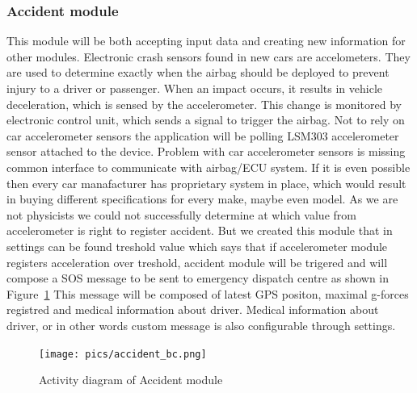 \subsubsection{Accident module} %
\label{ssub:accident_module}
This module will be both accepting input data and creating new information for other modules. Electronic crash sensors found in new cars are accelometers. They are used to determine exactly when the airbag should be deployed to prevent injury to a driver or passenger. When an impact occurs, it results in vehicle deceleration, which is sensed by the accelerometer. This change is monitored by electronic control unit, which sends a signal to trigger the airbag. Not to rely on car accelerometer sensors the application will be polling LSM303 accelerometer sensor attached to the device. Problem with car accelerometer sensors is missing common interface to communicate with airbag/ECU system. If it is even possible then every car manafacturer has proprietary system in place, which would result in buying different specifications for every make, maybe even model. As we are not physicists we could not successfully determine at which value from accelerometer is right to register accident. But we created this module that in settings can be found treshold value which says that if accelerometer module registers acceleration over treshold, accident module will be trigered and will compose a SOS message to be sent to emergency dispatch centre as shown in Figure~\ref{fig:acc_bc} This message will be composed of latest GPS positon, maximal g-forces registred and medical information about driver. Medical information about driver, or in other words custom message is also configurable through settings.
\begin{figure}[H]
\begin{center}
\captionsetup{font=small}
\texttt{[image: pics/accident\_bc.png]}
\caption{Activity diagram of Accident module}
\label{fig:acc_bc}
\end{center}
\end{figure}
